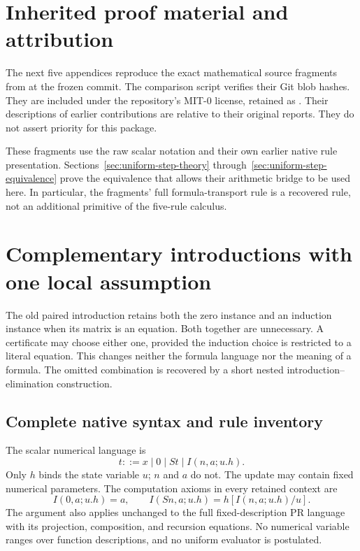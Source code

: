 \documentclass[11pt,letterpaper]{article}
\theoremstyle{definition}
\begin{document}
\clearpage
\appendix
\section{Inherited proof material and attribution}

The next five appendices reproduce the exact mathematical source
fragments from  at the
frozen commit. The comparison script verifies their Git blob hashes.
They are included under the repository's MIT-0 license, retained
as . Their descriptions of
earlier contributions are relative to their original reports.
They do not assert priority for this package.

These fragments use the raw scalar notation and their own earlier
native rule presentation. Sections~\ref{sec:uniform-step-theory}
through~\ref{sec:uniform-step-equivalence} prove the equivalence that
allows their arithmetic bridge to be used here. In particular,
the fragments' full formula-transport rule is a recovered rule,
not an additional primitive of the five-rule calculus.



\section{Complementary introductions with one local assumption}
\label{sec:choice-introduction}

The old paired introduction retains both the zero instance and an
induction instance when its matrix is an equation. Both together are
unnecessary. A certificate may choose either one, provided the induction
choice is restricted to a literal equation. This changes neither the
formula language nor the meaning of a formula. The omitted combination
is recovered by a short nested introduction--elimination construction.

\subsection{Complete native syntax and rule inventory}

The scalar numerical language is
\[
 t::=x\mid0\mid St\mid I(n,a;u.h).
\]
Only $h$ binds the state variable $u$; $n$ and $a$ do not.
The update may contain fixed numerical parameters. The computation
axioms in every retained context are
\[
 I(0,a;u.h)=a,\qquad
 I(Sn,a;u.h)=h[I(n,a;u.h)/u].
 \tag{I0, IS}\label{eq:choice-computations}
\]
The argument also applies unchanged to the full fixed-description PR
language with its projection, composition, and recursion equations.
No numerical variable ranges over function descriptions, and no uniform
evaluator is postulated.
\end{document}
